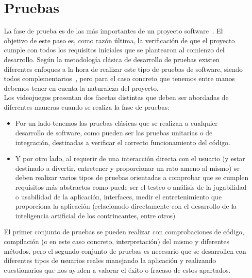 

\section{Pruebas}

La fase de prueba es de las más importantes de un proyecto software~\cite{art}. El objetivo de este paso es, como razón
última, la verificación de que el proyecto cumple con todos los requisitos iniciales que se plantearon al comienzo 
del desarrollo. Según la metodología clásica de desarrollo de pruebas existen diferentes enfoques a la hora de realizar
este tipo de pruebas de software, siendo todos complementarios~\cite{beizer_software_1990}, pero para el caso
concreto que tenemos entre manos debemos tener en cuenta la naturaleza del proyecto. \\

Los videojuegos presentan dos facetas distintas que deben ser abordadas de diferentes maneras cuando se realiza la fase
de pruebas:
\begin{itemize}
    \item Por un lado tenemos las pruebas clásicas que se realizan a cualquier desarrollo de software, como pueden
            ser las pruebas unitarias o de integración, destinadas a verificar el correcto funcionamiento del
            código.
    \item Y por otro lado, al requerir de una interacción directa con el usuario (y estar destinado a divertir,
            entretener y proporcionar un rato ameno al mismo) se deben realizar varios tipos de pruebas orientadas
            a comprobar que se cumplen requisitos más abstractos como puede ser el testeo o análisis de la jugabilidad
            o usabilidad de la aplicación, interfaces, medir el entretenimiento que proporciona la aplicación (relacionado
            directamente con el desarrollo de la inteligencia artificial de los contrincantes, entre otros)
\end{itemize}

El primer conjunto de pruebas se pueden realizar con comprobaciones de código, compilación (o en este caso concreto,
interpretación) del mismo y diferentes métodos, pero el segundo conjunto de pruebas es necesario que se desarrollen
con diferentes tipos de usuarios reales manejando la aplicación y realizando cuestionarios que nos ayuden a valorar
el éxito o fracaso de estos apartados. \\

